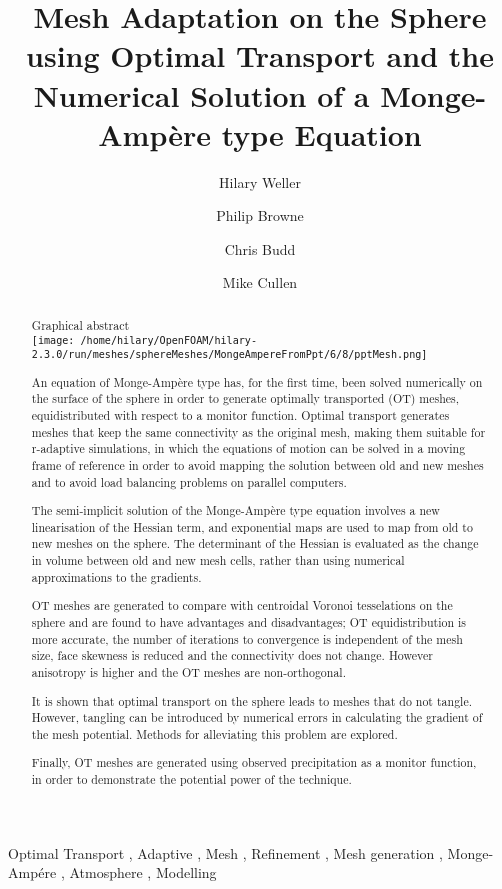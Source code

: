 \begin{frontmatter}

\title{Mesh Adaptation on the Sphere using Optimal Transport and the Numerical Solution of a Monge-Amp\`ere type Equation}

\author[label1]{Hilary Weller}
\author[label1]{Philip Browne}
\author[label2]{Chris Budd}
\author[label3]{Mike Cullen}
\address[label1]{Meteorology, University of Reading, UK}
\address[label2]{University of Bath, UK}
\address[label3]{Met Office, UK}

\begin{abstract}

Graphical abstract\\
\texttt{[image: /home/hilary/OpenFOAM/hilary-2.3.0/run/meshes/sphereMeshes/MongeAmpereFromPpt/6/8/pptMesh.png]}

An equation of Monge-Amp\`ere type has, for the first time, been solved numerically on the surface of the sphere in order to generate optimally transported (OT) meshes, equidistributed with respect to a monitor function. Optimal transport generates meshes that keep the same connectivity as the original mesh, making them suitable for r-adaptive simulations, in which the equations of motion can be solved in a moving frame of reference in order to avoid mapping the solution between old and new meshes and to avoid load balancing problems on parallel computers. 

The semi-implicit solution of the Monge-Amp\`ere type equation involves a new linearisation of the Hessian term, and exponential maps are used to map from old to new meshes on the sphere. The determinant of the Hessian is evaluated as the change in volume between old and new mesh cells, rather than using numerical approximations to the gradients. 

OT meshes are generated to compare with centroidal Voronoi tesselations on the sphere and are found to have advantages and disadvantages; OT equidistribution is more accurate, the number of iterations to convergence is independent of the mesh size, face skewness is reduced and the connectivity does not change. However anisotropy is higher and the OT meshes are non-orthogonal.

It is shown that optimal transport on the sphere leads to meshes that do not tangle. However, tangling can be introduced by numerical errors in calculating the gradient of the mesh potential. Methods for alleviating this problem are explored. 

Finally, OT meshes are generated using observed precipitation as a monitor function, in order to demonstrate the potential power of the technique.


\end{abstract}

\begin{keyword}
Optimal Transport \sep
Adaptive \sep
Mesh \sep
Refinement \sep
Mesh generation \sep
Monge-Amp\'ere \sep
Atmosphere \sep
Modelling
\end{keyword}

\end{frontmatter}


